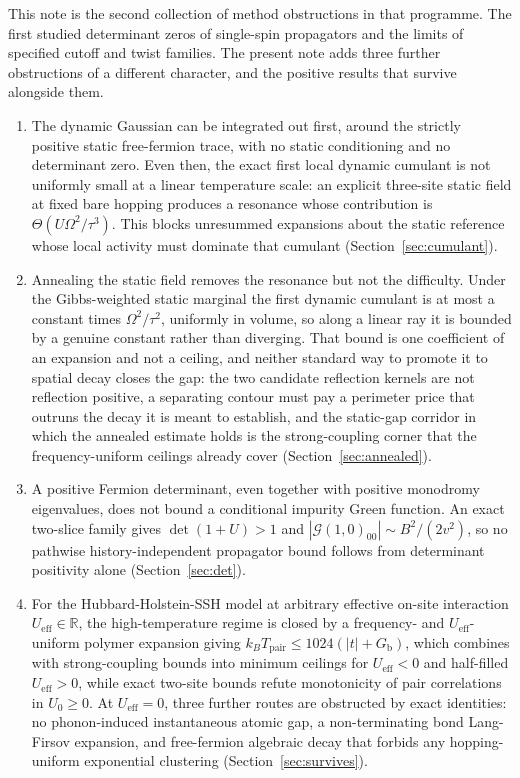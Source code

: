 \documentclass[11pt]{article}
\theoremstyle{definition}
\theoremstyle{remark}
\newcommand{\R}{\mathbb{R}}
\newcommand{\eff}{\mathrm{eff}}
\newcommand{\pair}{\mathrm{pair}}
\newcommand{\Ggreen}{\mathcal{G}}
\newcommand{\Tpair}{T_{\pair}}
\newcommand{\Gb}{G_{\mathrm{b}}}
\newcommand{\Ueff}{U_{\eff}}
\begin{document}
This note is the second collection of method obstructions in that programme. The
first \cite{barriers} studied determinant zeros of single-spin propagators and the
limits of specified cutoff and twist families. The present note adds three further
obstructions of a different character, and the positive results that survive
alongside them.

\begin{enumerate}[label=(\Alph*),leftmargin=2.2em]
\item The dynamic Gaussian can be integrated out first, around the strictly
positive static free-fermion trace, with no static conditioning and no determinant
zero. Even then, the exact first local dynamic cumulant is not uniformly small at a
linear temperature scale: an explicit three-site static field at fixed bare hopping
produces a resonance whose contribution is $\Theta(U\Omega^2/\tau^3)$. This blocks
unresummed expansions about the static reference whose local activity must dominate
that cumulant (Section~\ref{sec:cumulant}).
\item Annealing the static field removes the resonance but not the difficulty. Under
the Gibbs-weighted static marginal the first dynamic cumulant is at most a constant
times $\Omega^2/\tau^2$, uniformly in volume, so along a linear ray it is bounded by
a genuine constant rather than diverging. That bound is one coefficient of an
expansion and not a ceiling, and neither standard way to promote it to spatial decay
closes the gap: the two candidate reflection kernels are not reflection positive,
a separating contour must pay a perimeter price that outruns the decay it is meant to
establish, and the static-gap corridor in which the annealed estimate holds is the
strong-coupling corner that the frequency-uniform ceilings already cover
(Section~\ref{sec:annealed}).
\item A positive Fermion determinant, even together with positive monodromy
eigenvalues, does not bound a conditional impurity Green function. An exact
two-slice family gives $\det(1+U)>1$ and $|\Ggreen(1,0)_{00}|\sim B^2/(2v^2)$, so no
pathwise history-independent propagator bound follows from determinant positivity
alone (Section~\ref{sec:det}).
\item For the Hubbard-Holstein-SSH model at arbitrary effective on-site interaction
$\Ueff\in\R$, the high-temperature regime is closed by a frequency- and
$\Ueff$-uniform polymer expansion giving $k_B\Tpair\le1024(|t|+\Gb)$, which combines
with strong-coupling bounds into minimum ceilings for $\Ueff<0$ and half-filled
$\Ueff>0$, while exact two-site bounds refute monotonicity of pair correlations in
$U_0\ge0$. At $\Ueff=0$, three further routes are obstructed by exact identities: no
phonon-induced instantaneous atomic gap, a non-terminating bond Lang-Firsov
expansion, and free-fermion algebraic decay that forbids any hopping-uniform
exponential clustering (Section~\ref{sec:survives}).
\end{enumerate}
\end{document}
